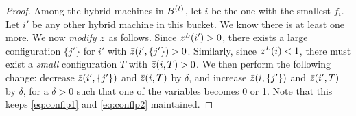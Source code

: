 \begin{proof}
Among the hybrid machines in $B^{(t)}$, let $i$  be the one with the smallest $f_i$. Let $i'$ be any other hybrid machine in this bucket. We know there is at least one more.
%	
%	
	We now \emph{modify} $\bar z$ as follows.
	Since $\bar z^L(i') > 0$, there exists a large configuration $\{j'\}$ for $i'$ with $\bar z(i',\{j'\}) > 0$. Similarly, since $\bar z^L(i) < 1$, there must exist a {\em small} configuration $T$ with $\bar z(i,T) > 0$.
	We then perform the following change: decrease $\bar z(i',\{j'\})$ and $\bar z(i,T)$ by $\delta$, and increase $\bar z(i,\{j'\})$ and $\bar z(i',T)$ by $\delta$,  for a $\delta > 0$ such that one of the variables becomes 0 or 1.
	Note that this keeps \eqref{eq:conflp1} and \eqref{eq:conflp2} maintained. 	%
	

\end{proof}

